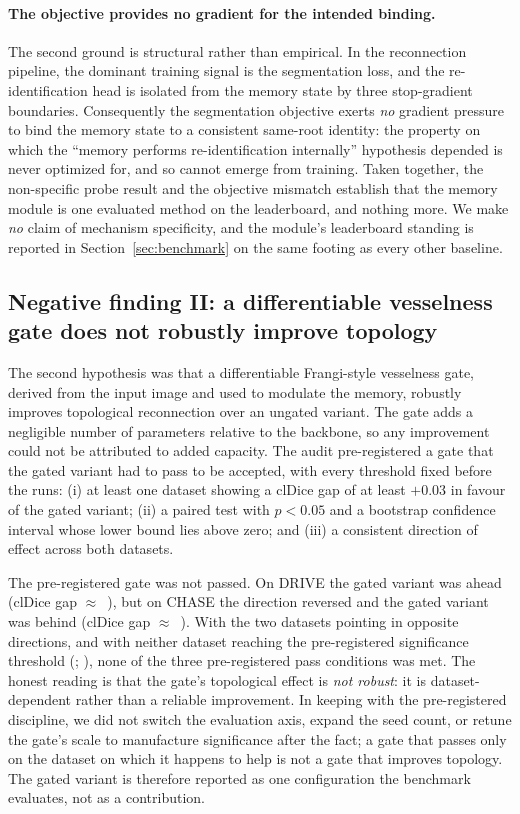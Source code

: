 \paragraph{The objective provides no gradient for the intended binding.}
The second ground is structural rather than empirical. In the reconnection
pipeline, the dominant training signal is the segmentation loss, and the
re-identification head is isolated from the memory state by three stop-gradient
boundaries. Consequently the segmentation objective exerts \emph{no} gradient
pressure to bind the memory state to a consistent same-root identity: the
property on which the ``memory performs re-identification internally''
hypothesis depended is never optimized for, and so cannot emerge from
training. Taken together, the non-specific probe result and the objective
mismatch establish that the memory module is one evaluated method on the
leaderboard, and nothing more. We make \emph{no} claim of mechanism
specificity, and the module's leaderboard standing is reported in
Section~\ref{sec:benchmark} on the same footing as every other baseline.

\subsection{Negative finding II: a differentiable vesselness gate does not robustly improve topology}
\label{sec:diagnostics:gate}

The second hypothesis was that a differentiable Frangi-style vesselness gate,
derived from the input image and used to modulate the memory, robustly
improves topological reconnection over an ungated variant. The gate adds a
negligible number of parameters relative to the backbone, so any improvement
could not be attributed to added capacity. The audit pre-registered a gate
that the gated variant had to pass to be accepted, with every threshold fixed
before the runs: (i) at least one dataset showing a clDice gap of at least
$+0.03$ in favour of the gated variant; (ii) a paired test with $p<0.05$ and
a bootstrap confidence interval whose lower bound lies above zero; and (iii)
a consistent direction of effect across both datasets.

The pre-registered gate was not passed. On DRIVE the gated variant was ahead
(clDice gap $\approx$~), but on CHASE the
direction reversed and the gated variant was behind
(clDice gap $\approx$~). With the two datasets
pointing in opposite directions, and with neither dataset reaching the
pre-registered significance threshold
(;
), none of the three
pre-registered pass conditions was met. The honest reading is that the gate's
topological effect is \emph{not robust}: it is dataset-dependent rather than a
reliable improvement. In keeping with the pre-registered discipline, we did
not switch the evaluation axis, expand the seed count, or retune the gate's
scale to manufacture significance after the fact; a gate that passes only on
the dataset on which it happens to help is not a gate that improves topology.
The gated variant is therefore reported as one configuration the benchmark
evaluates, not as a contribution.

